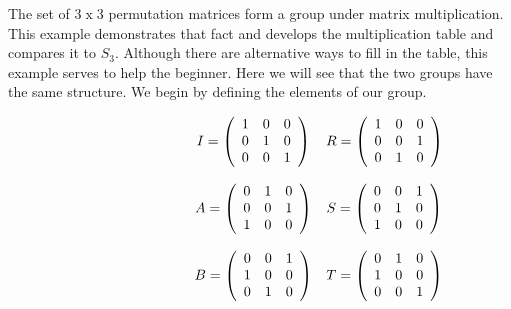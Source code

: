 \documentclass[12pt]{article}
\begin{document}

The set of $3\operatorname{x}3$ permutation matrices form a group under matrix multiplication.  This example demonstrates that fact and develops the multiplication table and compares it to $S_3$.  Although there are alternative ways to fill in the table, this example serves to help the beginner.  Here we will see that the two groups have the
same structure.  We begin by defining the elements of our group.

$\begin{array}{cc}
\hspace{45mm}
I=\left( \begin{array}{ccc}
1 & 0 & 0 \\
0 & 1 & 0 \\
0 & 0 & 1
\end{array} \right )

&

R=\left( \begin{array}{ccc}
1 & 0 & 0 \\
0 & 0 & 1 \\
0 & 1 & 0
\end{array} \right ) \\ \\

\hspace{45mm}

A=\left( \begin{array}{ccc}
0 & 1 & 0 \\
0 & 0 & 1 \\
1 & 0 & 0
\end{array} \right )

&

S=\left( \begin{array}{ccc}
0 & 0 & 1 \\
0 & 1 & 0 \\
1 & 0 & 0
\end{array} \right )
\\
\\

\hspace{45mm}

 B=\left( \begin{array}{ccc}
0 & 0 & 1 \\
1 & 0 & 0 \\
0 & 1 & 0
\end{array} \right )

&

T=\left( \begin{array}{ccc}
0 & 1 & 0 \\
1 & 0 & 0 \\
0 & 0 & 1
\end{array} \right )

\end{array}$
\end{document}
